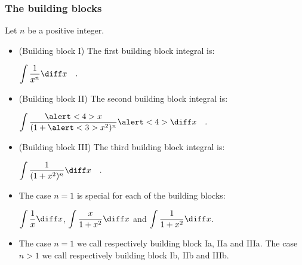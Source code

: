 \begin{frame}
\frametitle{The building blocks}
Let $n$ be a positive integer.
\begin{itemize}
\item (Building block I) The first building block integral is:  

$\displaystyle \int \frac{1}{x^n }\diff x\quad .$
\item<2-> (Building block II) The second building block integral is: 

$\displaystyle \int \frac{\alert<4>{x}}{(1+\alert<3>{x^2})^n }\alert<4>{\diff x}\quad .$ \quad {}
\item<5-> (Building block III) The third building block integral is: 

$\displaystyle \int \frac{1}{(1+x^2)^n }\diff x\quad .$
\item<6-> The case $n=1$ is special for each of the building blocks: 

$\displaystyle \int \frac{1}{x}\diff x$, $\displaystyle \int \frac{x}{1+x^2 }\diff x$ and $\displaystyle \int \frac{1}{1+x^2 }\diff x$.
\item<7-> The case $n=1$ we call respectively building block Ia, IIa and IIIa. 
 {The case $n>1$ we call respectively building block Ib, IIb and IIIb.} 
\end{itemize}

\end{frame}
